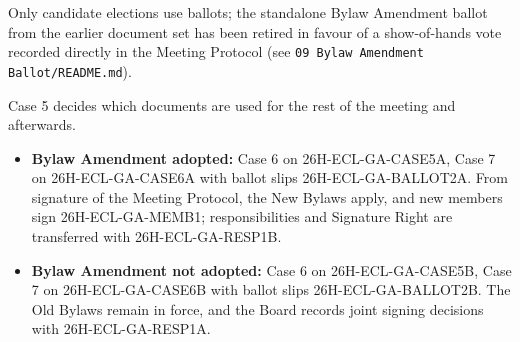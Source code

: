 \documentclass{../../../Common/Latex/Templates/rapport}
\begin{document}
Only candidate elections use ballots; the standalone Bylaw Amendment ballot from the earlier document set has been retired in favour of a show-of-hands vote recorded directly in the Meeting Protocol (see \texttt{09 Bylaw Amendment Ballot/README.md}).

Case 5 decides which documents are used for the rest of the meeting and afterwards.
\begin{itemize}
  \item \textbf{Bylaw Amendment adopted:} Case 6 on 26H-ECL-GA-CASE5A, Case 7 on 26H-ECL-GA-CASE6A with ballot slips 26H-ECL-GA-BALLOT2A. From signature of the Meeting Protocol, the New Bylaws apply, and new members sign 26H-ECL-GA-MEMB1; responsibilities and Signature Right are transferred with 26H-ECL-GA-RESP1B.
  \item \textbf{Bylaw Amendment not adopted:} Case 6 on 26H-ECL-GA-CASE5B, Case 7 on 26H-ECL-GA-CASE6B with ballot slips 26H-ECL-GA-BALLOT2B. The Old Bylaws remain in force, and the Board records joint signing decisions with 26H-ECL-GA-RESP1A.
\end{itemize}
\end{document}
